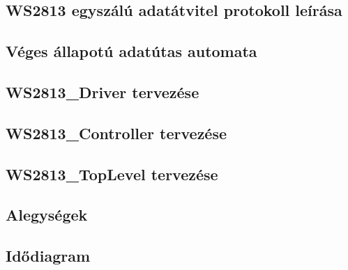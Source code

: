 \subsection{WS2813 egyszálú adatátvitel protokoll leírása}


\subsection{Véges állapotú adatútas automata}


\subsection{WS2813\_Driver tervezése}


\subsection{WS2813\_Controller tervezése}


\subsection{WS2813\_TopLevel tervezése}


\subsection{Alegységek}


\subsection{Idődiagram}
